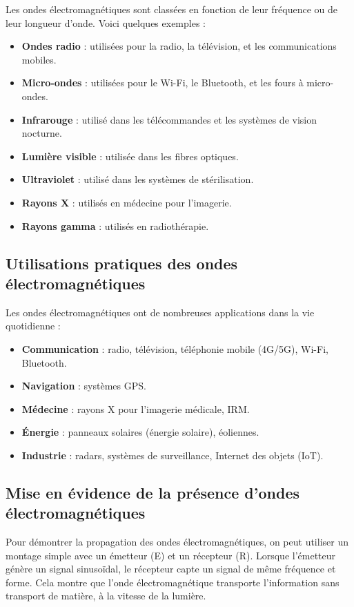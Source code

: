 \documentclass[12pt]{article}
\begin{document}
Les ondes électromagnétiques sont classées en fonction de leur fréquence ou de leur longueur d’onde. Voici quelques exemples :

\begin{itemize}
    \item \textbf{Ondes radio} : utilisées pour la radio, la télévision, et les communications mobiles.
    \item \textbf{Micro-ondes} : utilisées pour le Wi-Fi, le Bluetooth, et les fours à micro-ondes.
    \item \textbf{Infrarouge} : utilisé dans les télécommandes et les systèmes de vision nocturne.
    \item \textbf{Lumière visible} : utilisée dans les fibres optiques.
    \item \textbf{Ultraviolet} : utilisé dans les systèmes de stérilisation.
    \item \textbf{Rayons X} : utilisés en médecine pour l’imagerie.
    \item \textbf{Rayons gamma} : utilisés en radiothérapie.
\end{itemize}

\subsection{Utilisations pratiques des ondes électromagnétiques}

Les ondes électromagnétiques ont de nombreuses applications dans la vie quotidienne :

\begin{itemize}
    \item \textbf{Communication} : radio, télévision, téléphonie mobile (4G/5G), Wi-Fi, Bluetooth.
    \item \textbf{Navigation} : systèmes GPS.
    \item \textbf{Médecine} : rayons X pour l’imagerie médicale, IRM.
    \item \textbf{Énergie} : panneaux solaires (énergie solaire), éoliennes.
    \item \textbf{Industrie} : radars, systèmes de surveillance, Internet des objets (IoT).
\end{itemize}

\subsection{Mise en évidence de la présence d’ondes électromagnétiques}

Pour démontrer la propagation des ondes électromagnétiques, on peut utiliser un montage simple avec un émetteur (E) et un récepteur (R). Lorsque l’émetteur génère un signal sinusoïdal, le récepteur capte un signal de même fréquence et forme. Cela montre que l’onde électromagnétique transporte l’information sans transport de matière, à la vitesse de la lumière.
\end{document}
